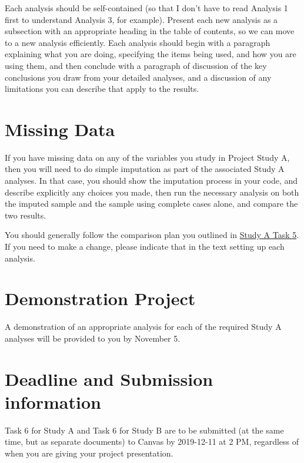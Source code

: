\documentclass[]{book}
\begin{document}
Each analysis should be self-contained (so that I don't have to read Analysis 1 first to understand Analysis 3, for example). Present each new analysis as a subsection with an appropriate heading in the table of contents, so we can move to a new analysis efficiently. Each analysis should begin with a paragraph explaining what you are doing, specifying the items being used, and how you are using them, and then conclude with a paragraph of discussion of the key conclusions you draw from your detailed analyses, and a discussion of any limitations you can describe that apply to the results.

\hypertarget{missing-data}{%
\section{Missing Data}\label{missing-data}}

If you have missing data on any of the variables you study in Project Study A, then you will need to do simple imputation as part of the associated Study A analyses. In that case, you should show the imputation process in your code, and describe explicitly any choices you made, then run the necessary analysis on both the imputed sample and the sample using complete cases alone, and compare the two results.

You should generally follow the comparison plan you outlined in \protect\hyperlink{task5a}{Study A Task 5}. If you need to make a change, please indicate that in the text setting up each analysis.

\hypertarget{demonstration-project}{%
\section{Demonstration Project}\label{demonstration-project}}

A demonstration of an appropriate analysis for each of the required Study A analyses will be provided to you by November 5.

\hypertarget{deadline-and-submission-information-9}{%
\section{Deadline and Submission information}\label{deadline-and-submission-information-9}}

Task 6 for Study A and Task 6 for Study B are to be submitted (at the same time, but as separate documents) to Canvas by 2019-12-11 at 2 PM, regardless of when you are giving your project presentation.
\end{document}
